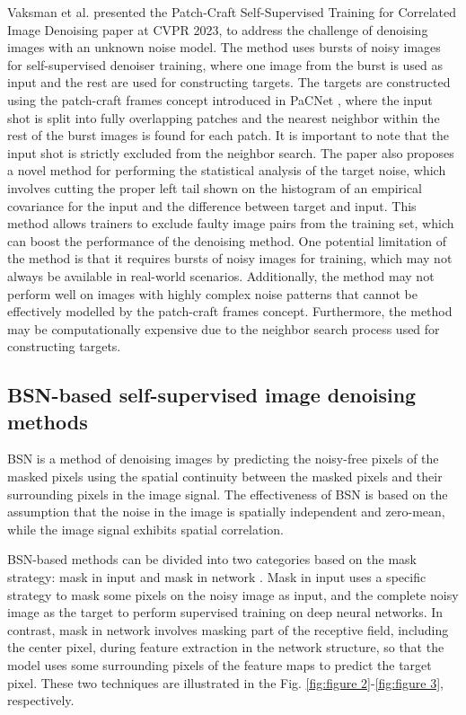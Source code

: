 \documentclass[conference]{IEEEtran}
\begin{document}
Vaksman et al. \cite{vaksman2023patch} presented the Patch-Craft Self-Supervised Training for Correlated Image Denoising paper at CVPR 2023, to address the challenge of denoising images with an unknown noise model. The method uses bursts of noisy images for self-supervised denoiser training, where one image from the burst is used as input and the rest are used for constructing targets. The targets are constructed using the patch-craft frames concept introduced in PaCNet \cite{efron2011tweedie}, where the input shot is split into fully overlapping patches and the nearest neighbor within the rest of the burst images is found for each patch. It is important to note that the input shot is strictly excluded from the neighbor search.
The paper also proposes a novel method for performing the statistical analysis of the target noise, which involves cutting the proper left tail shown on the histogram of an empirical covariance for the input and the difference between target and input. This method allows trainers to exclude faulty image pairs from the training set, which can boost the performance of the denoising method.
One potential limitation of the method is that it requires bursts of noisy images for training, which may not always be available in real-world scenarios. Additionally, the method may not perform well on images with highly complex noise patterns that cannot be effectively modelled by the patch-craft frames concept. Furthermore, the method may be computationally expensive due to the neighbor search process used for constructing targets.

\subsection{BSN-based self-supervised image denoising methods}
\noindent BSN is a method of denoising images by predicting the noisy-free pixels of the masked pixels using the spatial continuity between the masked pixels and their surrounding pixels in the image signal. The effectiveness of BSN is based on the assumption that the noise in the image is spatially independent and zero-mean, while the image signal exhibits spatial correlation. 

BSN-based methods can be divided into two categories based on the mask strategy: mask in input \cite{krull2019noise2void, batson2019noise2self, krull2020probabilistic, xie2020noise2same, quan2020self2self, kim2021noise2score, kim2022noise, wang2022blind2unblind, zhang2023self, ramani2008monte} and mask in network \cite{laine2019high, wu2020unpaired, lee2022ap, wang2023lg, zhang2023mm, li2023spatially}. Mask in input uses a specific strategy to mask some pixels on the noisy image as input, and the complete noisy image as the target to perform supervised training on deep neural networks. In contrast, mask in network involves masking part of the receptive field, including the center pixel, during feature extraction in the network structure, so that the model uses some surrounding pixels of the feature maps to predict the target pixel. These two techniques are illustrated in the Fig. \ref{fig:figure 2}-\ref{fig:figure 3}, respectively.
\end{document}
